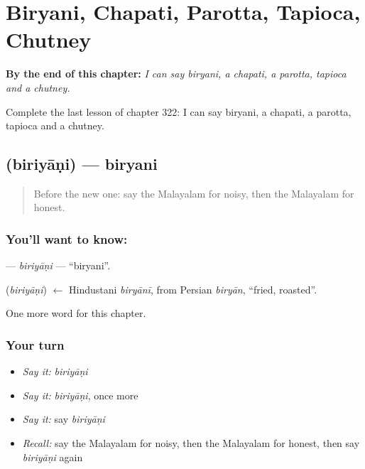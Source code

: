 
\chapter{Biryani, Chapati, Parotta, Tapioca, Chutney}
\label{ch:ml-biryani-chapati-parotta-tapioca-chutney}

\begin{chapteropening}
\textbf{By the end of this chapter:} \emph{I can say biryani, a chapati, a parotta, tapioca and a chutney.}

Complete the last lesson of chapter 322: I can say biryani, a chapati, a parotta, tapioca and a chutney.
\end{chapteropening}

\section[\texorpdfstring{\ml{ബിരിയാണി} (biriyāṇi)}{ബിരിയാണി (biriyāṇi)}]{ (biriyāṇi) — biryani}

\label{lesson:ML-C322-biriyani}



\begin{quote}
Before the new one: say the Malayalam for noisy, then the Malayalam for honest.
\end{quote}

\subsection*{You'll want to know: }
\textbf{} — \emph{biriyāṇi} — \textquotedblleft{}biryani\textquotedblright{}.

\begin{cousinweb}
\textbf{} (\emph{biriyāṇi}) $\leftarrow$ Hindustani \emph{biryānī}, from Persian \emph{biryān}, \textquotedblleft{}fried, roasted\textquotedblright{}.
\end{cousinweb}

\begin{grammarlens}[title={What you've built}]
One more word for this chapter.
\end{grammarlens}

\subsection*{Your turn}
\begin{itemize}
\raggedright
  \item \emph{Say it:} \emph{biriyāṇi}
  \item \emph{Say it:} \emph{biriyāṇi}, once more
  \item \emph{Say it:} say \emph{biriyāṇi}
  \item \emph{Recall:} say the Malayalam for noisy, then the Malayalam for honest, then say \emph{biriyāṇi} again
\end{itemize}

